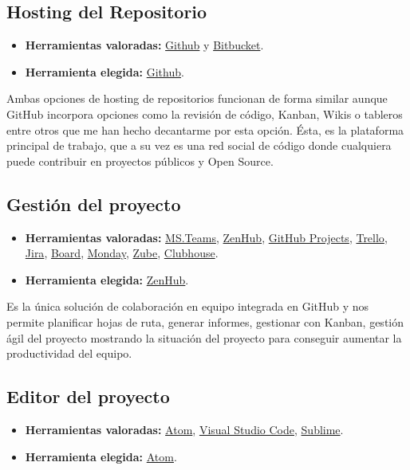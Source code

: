 \subsection{Hosting del Repositorio}\label{4:GitHUb}
\begin{itemize}
    \item \textbf{Herramientas valoradas:} \href{https://github.com/}{Github} y \href{https://bitbucket.org/product/}{Bitbucket}.
    \item \textbf{Herramienta elegida:} \href{https://github.com/}{Github}.
\end{itemize}

Ambas opciones de hosting de repositorios funcionan de forma similar aunque GitHub incorpora opciones como la revisión de código, Kanban, Wikis o tableros entre otros que me han hecho decantarme por esta opción.
Ésta, es la plataforma principal de trabajo, que a su vez es una red social de código donde cualquiera puede contribuir en proyectos públicos y Open Source.


\subsection{Gestión del proyecto}\label{4:ZenHub}
\begin{itemize}
    \item \textbf{Herramientas valoradas:} \href{https://teams.microsoft.com/}{MS.Teams}, \href{https://www.zenhub.com/}{ZenHub}, \href{https://github.com/}{GitHub Projects}, \href{https://www.zenhub.com/}{Trello}, \href{https://www.atlassian.com/es/software/jira}{Jira}, \href{https://www.board.com/es#gref}{Board}, \href{https://monday.com/lang/es/}{Monday}, \href{https://zube.io/}{Zube}, \href{https://clubhouse.io/}{Clubhouse}.
    \item \textbf{Herramienta elegida:} \href{https://www.zenhub.com/}{ZenHub}.
\end{itemize}

Es la única solución de colaboración en equipo integrada en GitHub y nos permite planificar hojas de ruta, generar informes, gestionar con Kanban, gestión ágil del proyecto mostrando la situación del proyecto para conseguir aumentar la productividad del equipo.

\subsection{Editor del proyecto}\label{4:ATOM}
\begin{itemize}
    \item \textbf{Herramientas valoradas:} \href{https://atom.io/}{Atom}, \href{https://code.visualstudio.com/}{Visual Studio Code}, \href{https://www.sublimetext.com/}{Sublime}.
    \item \textbf{Herramienta elegida:} \href{https://atom.io/}{Atom}.
\end{itemize}

